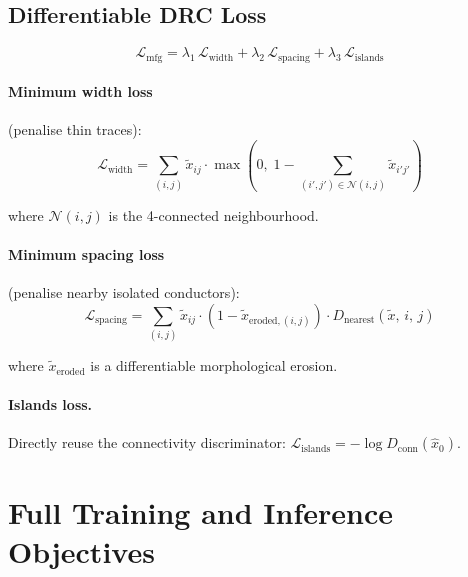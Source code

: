 \documentclass[12pt,a4paper]{article}
\newcommand{\xtilde}{\tilde{x}}
\theoremstyle{definition}
\theoremstyle{plain}
\theoremstyle{remark}
\begin{document}
\subsection{Differentiable DRC Loss}

\begin{equation}
  \mathcal{L}_{\mathrm{mfg}}
  = \lambda_1\,\mathcal{L}_{\mathrm{width}}
  + \lambda_2\,\mathcal{L}_{\mathrm{spacing}}
  + \lambda_3\,\mathcal{L}_{\mathrm{islands}}
  \label{eq:lmfg}
\end{equation}

\paragraph{Minimum width loss} (penalise thin traces):
\begin{equation}
  \mathcal{L}_{\mathrm{width}}
  = \sum_{(i,j)} \xtilde_{ij}
    \cdot \max\!\left(0,\; 1 - \sum_{(i',j') \in \mathcal{N}(i,j)} \xtilde_{i'j'}\right)
  \label{eq:lwidth}
\end{equation}

where $\mathcal{N}(i,j)$ is the 4-connected neighbourhood.

\paragraph{Minimum spacing loss} (penalise nearby isolated conductors):
\begin{equation}
  \mathcal{L}_{\mathrm{spacing}}
  = \sum_{(i,j)} \xtilde_{ij}
    \cdot (1 - \xtilde_{\mathrm{eroded},(i,j)})
    \cdot D_{\mathrm{nearest}}(\xtilde,\, i,\, j)
  \label{eq:lspacing}
\end{equation}

where $\xtilde_{\mathrm{eroded}}$ is a differentiable morphological erosion.

\paragraph{Islands loss.}
Directly reuse the connectivity discriminator:
$\mathcal{L}_{\mathrm{islands}} = -\log D_{\mathrm{conn}}(\hat{x}_0)$.

\section{Full Training and Inference Objectives}
\label{sec:training}
\end{document}
